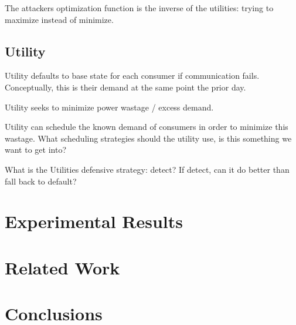 \documentclass{article}
\begin{document}
\begin{multicols}{2}
The attackers optimization function is the inverse of the utilities: trying to maximize instead of minimize.

\subsection{Utility}

Utility defaults to base state for each consumer if communication fails.  Conceptually, this is their demand at the same 
point the prior day.

Utility seeks to minimize power wastage / excess demand.

Utility can schedule the known demand of consumers in order to minimize this wastage.  What scheduling strategies
should the utility use, is this something we want to get into?

What is the Utilities defensive strategy: detect? If detect, can it do better than fall back to default?

\section{Experimental Results}
\section{Related Work}
\section{Conclusions}
\end{multicols}
\end{document}
